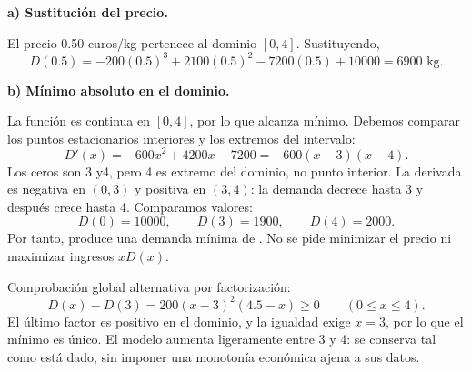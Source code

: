 \textbf{a) Sustitución del precio.}\par\nopagebreak[4]
El precio 0.50 euros/kg pertenece al dominio $[0,4]$. Sustituyendo,
\[
D(0.5)=-200(0.5)^3+2100(0.5)^2-7200(0.5)+10000
=\boxed{6900\text{ kg}}.
\]

\textbf{b) Mínimo absoluto en el dominio.}\par\nopagebreak[4]
La función es continua en $[0,4]$, por lo que alcanza mínimo. Debemos comparar los puntos estacionarios interiores y los extremos del intervalo:
\[
D'(x)=-600x^2+4200x-7200=-600(x-3)(x-4).
\]
Los ceros son 3 y4, pero 4 es extremo del dominio, no punto interior. La derivada es negativa en $(0,3)$ y positiva en $(3,4)$: la demanda decrece hasta 3 y después crece hasta 4. Comparamos valores:
\[
D(0)=10000,\qquad D(3)=1900,\qquad D(4)=2000.
\]
Por tanto,  produce una demanda mínima de . No se pide minimizar el precio ni maximizar ingresos $xD(x)$.

Comprobación global alternativa por factorización:
\[
D(x)-D(3)=200(x-3)^2(4.5-x)\geq0\qquad(0\leq x\leq4).
\]
El último factor es positivo en el dominio, y la igualdad exige $x=3$, por lo que el mínimo es único. El modelo aumenta ligeramente entre 3 y 4: se conserva tal como está dado, sin imponer una monotonía económica ajena a sus datos.
